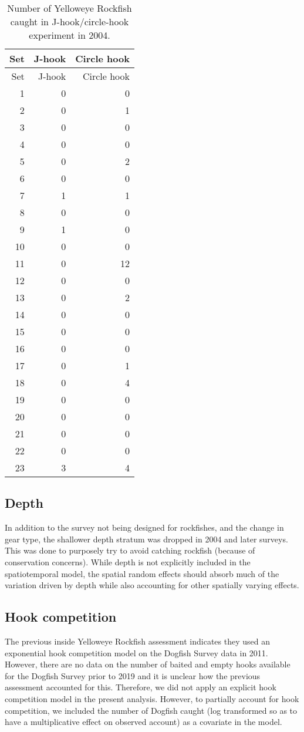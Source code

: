 \documentclass[11pt]{book}
\begin{document}
\clearpage
\begin{longtable}[]{@{}rrr@{}}
\caption{\label{tab:dogfish-hook-comparison}Number of Yelloweye Rockfish caught in J-hook/circle-hook experiment in 2004.}\tabularnewline
\toprule
Set & J-hook & Circle hook\tabularnewline
\midrule
\endfirsthead
\toprule
Set & J-hook & Circle hook\tabularnewline
\midrule
\endhead
1 & 0 & 0\tabularnewline
2 & 0 & 1\tabularnewline
3 & 0 & 0\tabularnewline
4 & 0 & 0\tabularnewline
5 & 0 & 2\tabularnewline
6 & 0 & 0\tabularnewline
7 & 1 & 1\tabularnewline
8 & 0 & 0\tabularnewline
9 & 1 & 0\tabularnewline
10 & 0 & 0\tabularnewline
11 & 0 & 12\tabularnewline
12 & 0 & 0\tabularnewline
13 & 0 & 2\tabularnewline
14 & 0 & 0\tabularnewline
15 & 0 & 0\tabularnewline
16 & 0 & 0\tabularnewline
17 & 0 & 1\tabularnewline
18 & 0 & 4\tabularnewline
19 & 0 & 0\tabularnewline
20 & 0 & 0\tabularnewline
21 & 0 & 0\tabularnewline
22 & 0 & 0\tabularnewline
23 & 3 & 4\tabularnewline
\bottomrule
\end{longtable}
\hypertarget{sec:dog-depth}{%
\subsection{Depth}\label{sec:dog-depth}}

In addition to the survey not being designed for rockfishes, and the change in gear type, the shallower depth stratum was dropped in 2004 and later surveys. This was done to purposely try to avoid catching rockfish (because of conservation concerns). While depth is not explicitly included in the spatiotemporal model, the spatial random effects should absorb much of the variation driven by depth while also accounting for other spatially varying effects.

\hypertarget{sec:dog-hook-competition}{%
\subsection{Hook competition}\label{sec:dog-hook-competition}}

The previous inside Yelloweye Rockfish assessment indicates they used an exponential hook competition model on the Dogfish Survey data in 2011. However, there are no data on the number of baited and empty hooks available for the Dogfish Survey prior to 2019 and it is unclear how the previous assessment accounted for this. Therefore, we did not apply an explicit hook competition model in the present analysis. However, to partially account for hook competition, we included the number of Dogfish caught (log transformed so as to have a multiplicative effect on observed account) as a covariate in the model.
\end{document}
